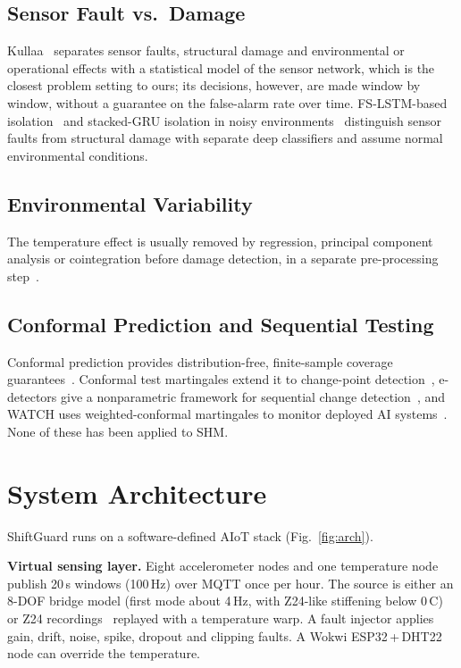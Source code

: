 \documentclass[conference]{IEEEtran}
\begin{document}
\subsection{Sensor Fault vs.\ Damage}
Kullaa~\cite{kullaa2011} separates sensor faults, structural damage and environmental or operational effects with a statistical model of the sensor network, which is the closest problem setting to ours; its decisions, however, are made window by window, without a guarantee on the false-alarm rate over time. FS-LSTM-based isolation~\cite{li2021fslstm} and stacked-GRU isolation in noisy environments~\cite{liu2022sgru} distinguish sensor faults from structural damage with separate deep classifiers and assume normal environmental conditions.

\subsection{Environmental Variability}
The temperature effect is usually removed by regression, principal component analysis or cointegration before damage detection, in a separate pre-processing step~\cite{peeters2001}.

\subsection{Conformal Prediction and Sequential Testing}
Conformal prediction provides distribution-free, finite-sample coverage guarantees~\cite{angelopoulos2023}. Conformal test martingales extend it to change-point detection~\cite{vovk2021}, e-detectors give a nonparametric framework for sequential change detection~\cite{shin2023}, and WATCH uses weighted-conformal martingales to monitor deployed AI systems~\cite{prinster2025}. None of these has been applied to SHM.

\section{System Architecture}
ShiftGuard runs on a software-defined AIoT stack (Fig.~\ref{fig:arch}).

\textbf{Virtual sensing layer.} Eight accelerometer nodes and one temperature node publish 20\,s windows (100\,Hz) over MQTT once per hour. The source is either an 8-DOF bridge model (first mode about 4\,Hz, with Z24-like stiffening below 0\,\textdegree C) or Z24 recordings~\cite{z24,z24hf} replayed with a temperature warp. A fault injector applies gain, drift, noise, spike, dropout and clipping faults. A Wokwi ESP32\,+\,DHT22 node can override the temperature.
\end{document}
